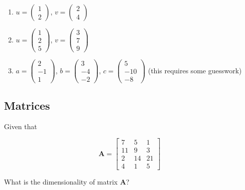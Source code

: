 \documentclass[
  letterpaper,
]{book}
\theoremstyle{definition}
\theoremstyle{definition}
\theoremstyle{plain}
\theoremstyle{definition}
\theoremstyle{plain}
\theoremstyle{plain}
\theoremstyle{remark}
\begin{document}
\begin{enumerate}
\def\labelenumi{\arabic{enumi}.}
\item
  \(u = \begin{pmatrix} 1\\ 2\end{pmatrix}\),
  \(v = \begin{pmatrix} 2\\4\end{pmatrix}\)
\item
  \(u = \begin{pmatrix} 1\\ 2\\ 5 \end{pmatrix}\),
  \(v = \begin{pmatrix} 3\\ 7\\ 9 \end{pmatrix}\)
\item
  \(a = \begin{pmatrix} 2\\ -1\\ 1 \end{pmatrix}\),
  \(b = \begin{pmatrix} 3\\ -4\\ -2 \end{pmatrix}\),
  \(c = \begin{pmatrix} 5\\ -10\\ -8 \end{pmatrix}\) (this requires some
  guesswork)
\end{enumerate}

\hypertarget{matrices}{%
\subsection*{Matrices}\label{matrices}}

Given that

\[
\mathbf{A}=\begin{bmatrix}
            7 & 5 & 1 \\
            11 & 9 & 3 \\ 
            2 & 14 & 21 \\ 
            4 & 1 & 5
        \end{bmatrix}
\]

What is the dimensionality of matrix \(\mathbf{A}\)?
\end{document}
